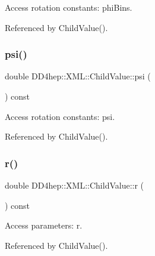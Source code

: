 Access rotation constants\+: phi\+Bins. 



Referenced by Child\+Value().

\hypertarget{struct_d_d4hep_1_1_x_m_l_1_1_child_value_a69bf8ea626bca54aa3c016bdcf81ebb7}{}\label{struct_d_d4hep_1_1_x_m_l_1_1_child_value_a69bf8ea626bca54aa3c016bdcf81ebb7} 
\subsubsection{\texorpdfstring{psi()}{psi()}}
{\footnotesize\ttfamily double D\+D4hep\+::\+X\+M\+L\+::\+Child\+Value\+::psi (\begin{DoxyParamCaption}{ }\end{DoxyParamCaption}) const}



Access rotation constants\+: psi. 



Referenced by Child\+Value().

\hypertarget{struct_d_d4hep_1_1_x_m_l_1_1_child_value_a8a21955cffd06ea588042536eeafafdb}{}\label{struct_d_d4hep_1_1_x_m_l_1_1_child_value_a8a21955cffd06ea588042536eeafafdb} 
\subsubsection{\texorpdfstring{r()}{r()}\hspace{0.1cm}{\footnotesize\ttfamily [1/2]}}
{\footnotesize\ttfamily double D\+D4hep\+::\+X\+M\+L\+::\+Child\+Value\+::r (\begin{DoxyParamCaption}{ }\end{DoxyParamCaption}) const}



Access parameters\+: r. 



Referenced by Child\+Value().

\hypertarget{struct_d_d4hep_1_1_x_m_l_1_1_child_value_a043cecf0132f1be7316f5355829ab9f9}{}\label{struct_d_d4hep_1_1_x_m_l_1_1_child_value_a043cecf0132f1be7316f5355829ab9f9} 
